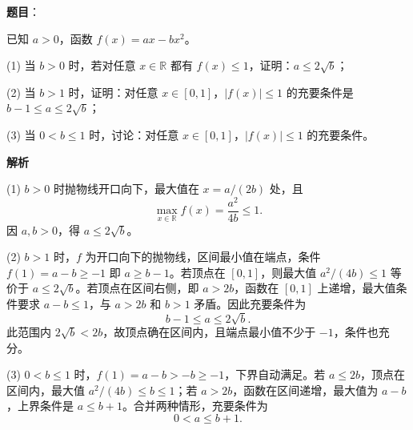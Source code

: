 \begin{answer}

\textbf{题目}：

已知 $a>0$，函数 $f(x)=ax-bx^2$。

(1) 当 $b>0$ 时，若对任意 $x\in\mathbb R$ 都有 $f(x)\leqslant1$，证明：$a\leqslant2\sqrt b$；

(2) 当 $b>1$ 时，证明：对任意 $x\in[0,1]$，$|f(x)|\leqslant1$ 的充要条件是 $b-1\leqslant a\leqslant2\sqrt b$；

(3) 当 $0<b\leqslant1$ 时，讨论：对任意 $x\in[0,1]$，$|f(x)|\leqslant1$ 的充要条件。

\textbf{解析}


(1) $b>0$ 时抛物线开口向下，最大值在 $x=a/(2b)$ 处，且
\nopagebreak[4]
\[
\max_{x\in\mathbb R}f(x)=\frac{a^2}{4b}\leqslant1.
\]
因 $a,b>0$，得 $a\leqslant2\sqrt b$。


(2) $b>1$ 时，$f$ 为开口向下的抛物线，区间最小值在端点，条件 $f(1)=a-b\geqslant-1$ 即 $a\geqslant b-1$。若顶点在 $[0,1]$，则最大值 $a^2/(4b)\leqslant1$ 等价于 $a\leqslant2\sqrt b$。若顶点在区间右侧，即 $a>2b$，函数在 $[0,1]$ 上递增，最大值条件要求 $a-b\leqslant1$，与 $a>2b$ 和 $b>1$ 矛盾。因此充要条件为
\nopagebreak[4]
\[
b-1\leqslant a\leqslant2\sqrt b.
\]
此范围内 $2\sqrt b<2b$，故顶点确在区间内，且端点最小值不少于 $-1$，条件也充分。


(3) $0<b\leqslant1$ 时，$f(1)=a-b>-b\geqslant-1$，下界自动满足。若 $a\leqslant2b$，顶点在区间内，最大值 $a^2/(4b)\leqslant b\leqslant1$；若 $a>2b$，函数在区间递增，最大值为 $a-b$，上界条件是 $a\leqslant b+1$。合并两种情形，充要条件为
\nopagebreak[4]
\[
0<a\leqslant b+1.
\]




\end{answer}